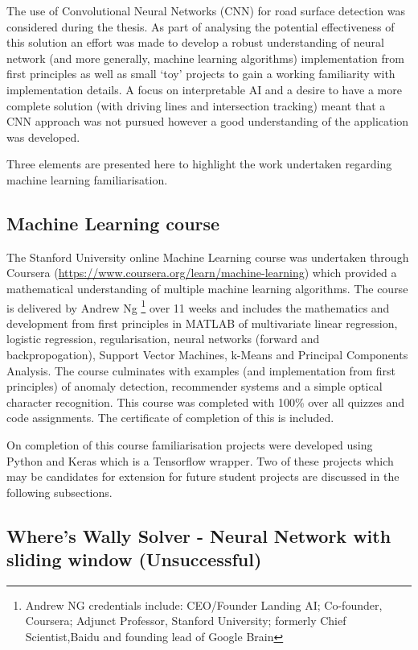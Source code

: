 \documentclass{article}
\begin{document}
The use of Convolutional Neural Networks (CNN) for road surface detection was considered during the thesis. As part of analysing the potential effectiveness of this solution an effort was made to develop a robust understanding of neural network (and more generally, machine learning algorithms) implementation from first principles as well as small `toy' projects to gain a working familiarity with implementation details. A focus on interpretable AI and a desire to have a more complete solution (with driving lines and intersection tracking) meant that a CNN approach was not pursued however a good understanding of the application was developed.

Three elements are presented here to highlight the work undertaken regarding machine learning familiarisation.

\subsection{Machine Learning course}

The Stanford University online Machine Learning course was undertaken through Coursera (\url{https://www.coursera.org/learn/machine-learning}) which provided a mathematical understanding of multiple machine learning algorithms. The course is delivered by Andrew Ng \footnote{Andrew NG credentials include: CEO/Founder Landing AI; Co-founder, Coursera; Adjunct Professor, Stanford University; formerly Chief Scientist,Baidu and founding lead of Google Brain} over 11 weeks and includes the mathematics and development from first principles in MATLAB of multivariate linear regression, logistic regression, regularisation, neural networks (forward and backpropogation), Support Vector Machines, k-Means and Principal Components Analysis. The course culminates with examples (and implementation from first principles) of anomaly detection, recommender systems and a simple optical character recognition. This course was completed with 100\% over all quizzes and code assignments. The certificate of completion of this is included. 

On completion of this course familiarisation projects were developed using Python and Keras which is a Tensorflow wrapper. Two of these projects which may be candidates for extension for future student projects are discussed in the following subsections.


\subsection{Where's Wally Solver - Neural Network with sliding window (Unsuccessful)}
\end{document}
